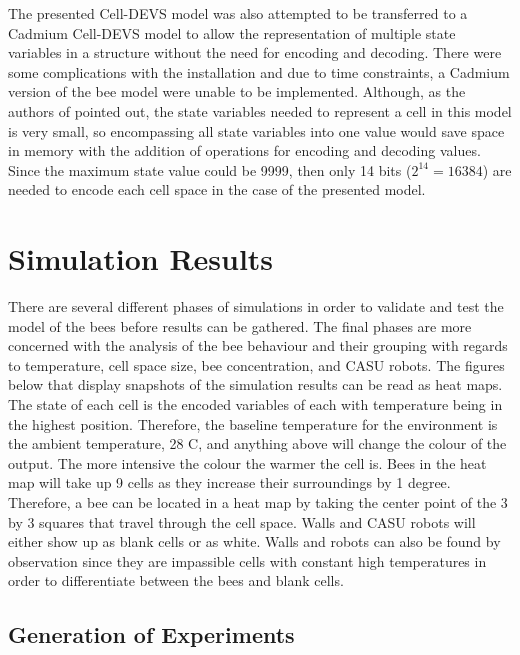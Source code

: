 \documentclass[conference,compsoc,onecolumn]{IEEEtran}
\begin{document}
The presented Cell-DEVS model was also attempted to be transferred to a Cadmium Cell-DEVS model to allow the representation of multiple state variables in a structure without the need for encoding and decoding. There were some complications with the installation and due to time constraints, a Cadmium version of the bee model were unable to be implemented. Although, as the authors of \cite{Stefanc2017} pointed out, the state variables needed to represent a cell in this model is very small, so encompassing all state variables into one value would save space in memory with the addition of operations for encoding and decoding values. Since the maximum state value could be 9999, then only 14 bits ($2^{14}=16384$) are needed to encode each cell space in the case of the presented model.

\section{Simulation Results}\label{results}

There are several different phases of simulations in order to validate and test the model of the bees before results can be gathered. The final phases are more concerned with the analysis of the bee behaviour and their grouping with regards to temperature, cell space size, bee concentration, and CASU robots. The figures below that display snapshots of the simulation results can be read as heat maps. The state of each cell is the encoded variables of each with temperature being in the highest position. Therefore, the baseline temperature for the environment is the ambient temperature, 28 \degree C, and anything above will change the colour of the output. The more intensive the colour the warmer the cell is. Bees in the heat map will take up 9 cells as they increase their surroundings by 1 degree. Therefore, a bee can be located in a heat map by taking the center point of the 3 by 3 squares that travel through the cell space. Walls and CASU robots will either show up as blank cells or as white. Walls and robots can also be found by observation since they are impassible cells with constant high temperatures in order to differentiate between the bees and blank cells.

\subsection{Generation of Experiments}
\end{document}
